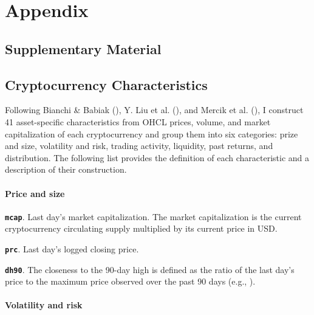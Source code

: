 \documentclass[
  12pt,
  a4paper,
  openany]{scrbook}
\begin{document}
\cleardoublepage
{}
{}
\appendix

\chapter{Appendix}\label{appendix}

\section{Supplementary Material}\label{sec-app_material}

\section{Cryptocurrency Characteristics}\label{sec-app_characteristics}

Following Bianchi \& Babiak
(), Y. Liu et
al. (), and Mercik et al.
(),
I construct 41 asset-specific characteristics from OHCL prices, volume,
and market capitalization of each cryptocurrency and group them into six
categories: prize and size, volatility and risk, trading activity,
liquidity, past returns, and distribution. The following list provides
the definition of each characteristic and a description of their
construction.

\subsubsection{Price and size}\label{price-and-size}

\textbf{\texttt{mcap}}. Last day's market capitalization. The market
capitalization is the current cryptocurrency circulating supply
multiplied by its current price in USD.

\textbf{\texttt{prc}}. Last day's logged closing price.

\textbf{\texttt{dh90}}. The closeness to the 90-day high is defined as
the ratio of the last day's price to the maximum price observed over the
past 90 days (e.g., ).

\subsubsection{Volatility and risk}\label{volatility-and-risk}
\end{document}
